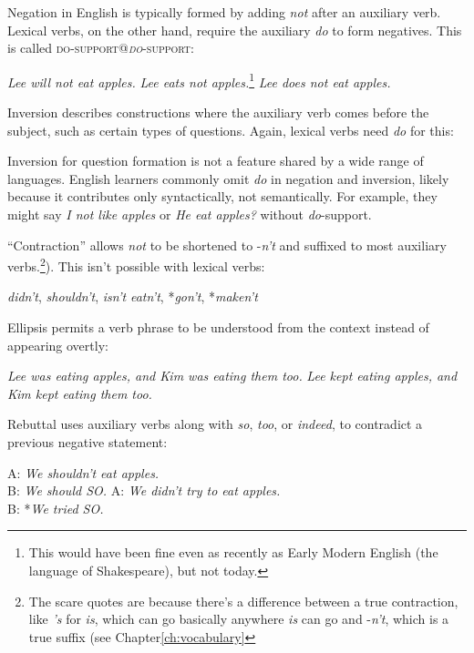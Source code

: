 Negation in English is typically formed by adding \textit{not} after an auxiliary verb. Lexical verbs, on the other hand, require the auxiliary \textit{do} to form negatives. This is called \textsc{do-support@\textit{do}-support}:

\ea
\ea \textit{Lee will not eat apples.}
\ex *\textit{Lee eats not apples.}\footnote{This would have been fine even as recently as Early Modern English (the language of Shakespeare), but not today.}
\ex \textit{Lee does not eat apples.}
\z\z

Inversion describes constructions where the auxiliary verb comes before the subject, such as certain types of questions. Again, lexical verbs need \textit{do} for this:


Inversion for question formation is not a feature shared by a wide range of languages. English learners commonly omit \textit{do} in negation and inversion, likely because it contributes only syntactically, not semantically. For example, they might say \textit{I not like apples} or \textit{He eat apples?} without \textit{do}-support.

``Contraction'' allows \textit{not} to be shortened to -\textit{n't} and suffixed to most auxiliary verbs.\footnote{The scare quotes are because there's a difference between a true contraction, like \textit{'s} for \textit{is}, which can go basically anywhere \textit{is} can go and -\textit{n't}, which is a true suffix (see Chapter\ref{ch:vocabulary}}). This isn't possible with lexical verbs:

\ea \textit{didn't}, \textit{shouldn't}, \textit{isn't}
\ex *\textit{eatn't}, *\textit{gon't}, *\textit{maken't}
\z

Ellipsis permits a verb phrase to be understood from the context instead of appearing overtly:

\ea \textit{Lee was eating apples, and Kim was {\op}eating them{\cp} too.}
\ex *\textit{Lee kept eating apples, and Kim kept {\op}eating them{\cp} too.}
\z

Rebuttal uses auxiliary verbs along with \textit{so}, \textit{too}, or \textit{indeed}, to contradict a previous negative statement:

\ea A: \textit{We shouldn't eat apples.}\\
B: \textit{We should SO.}
\ex A: \textit{We didn't try to eat apples.}
\\ B: *\textit{We tried SO.}
\z

